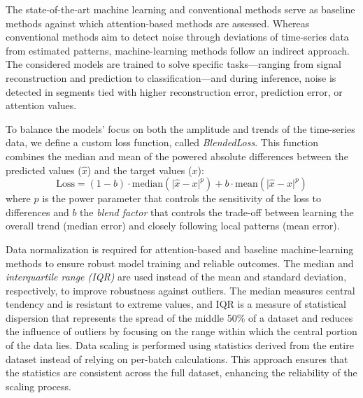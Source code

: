 \documentclass[conference]{IEEEtran}
\begin{document}
The state-of-the-art machine learning and conventional methods serve as baseline methods against which attention-based methods are assessed.
Whereas conventional methods aim to detect noise through deviations of time-series data from estimated patterns, machine-learning methods follow an indirect approach. The considered models are trained to solve specific tasks---ranging from signal reconstruction and prediction to classification---and during inference, noise is detected in segments tied with higher reconstruction error, prediction error, or attention values.

To balance the models' focus on both the amplitude and trends of the time-series data, we define a custom loss function, called \emph{BlendedLoss}. This function combines the median and mean of the powered absolute differences between the predicted values ($\hat{x}$) and the target values ($x$):
%
\begin{equation}
\text{Loss} =
  (1 - b)\cdot\mathrm{median}(\lvert \hat{x} - x \rvert^p) +
  b\cdot\mathrm{mean}(\lvert \hat{x} - x \rvert^p)
\label{eq:blended_loss}
\end{equation}
%
where $p$ is the power parameter that controls the sensitivity of the
loss to differences and $b$ the \emph{blend factor} that controls
the trade-off between learning the overall trend (median error) and
closely following local patterns (mean error).

Data normalization is required for attention-based and baseline machine-learning methods to ensure robust model training and reliable outcomes. The median and \emph{interquartile range (IQR)} are used instead of the mean and standard deviation, respectively, to improve robustness against outliers. The median measures central tendency and is resistant to extreme values,
and IQR is a measure of statistical dispersion that represents the spread of the middle 50\% of a dataset and reduces the influence of outliers by focusing on the range within which the central portion of the data lies. Data scaling is performed using statistics derived from the entire dataset instead of relying on per-batch calculations. This approach ensures that the statistics are consistent across the full dataset, enhancing the reliability of the scaling process. 
\end{document}
